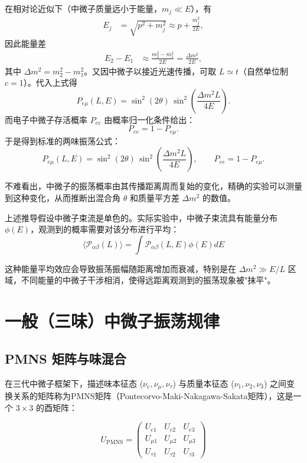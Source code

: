 在相对论近似下（中微子质量远小于能量，$m_j \ll E$），有
\begin{align*}
E_j &= \sqrt{p^2 + m_j^2} \approx p + \frac{m_j^2}{2E},
\end{align*}
因此能量差
\begin{align*}
E_2 - E_1 &\approx \frac{m_2^2 - m_1^2}{2E} = \frac{\Delta m^2}{2E},
\end{align*}
其中 $\Delta m^2 = m_2^2 - m_1^2$。又因中微子以接近光速传播，可取 $L \simeq t$（自然单位制 $c=1$）。代入上式得
\[
P_{e\mu}(L,E) = \sin^2(2\theta) \, \sin^2\!\left( \frac{\Delta m^2 L}{4E} \right).
\]
而电子中微子存活概率 $P_{ee}$ 由概率归一化条件给出：
\[
P_{ee} = 1 - P_{e\mu}.
\]
于是得到标准的两味振荡公式：
\begin{equation}\label{eq:2flavor}
\boxed{
P_{e\mu}(L,E) = \sin^2(2\theta) \, \sin^2\!\left( \frac{\Delta m^2 L}{4E} \right), \qquad
P_{ee} = 1 - P_{e\mu}.
}
\end{equation}

不难看出，中微子的振荡概率由其传播距离周而复始的变化，精确的实验可以测量到这种变化，从而推断出混合角 $\theta$ 和质量平方差 $\Delta m^2$ 的数值。
\begin{derivationnote}[实际束流的平均效应]
上述推导假设中微子束流是单色的。实际实验中，中微子束流具有能量分布 $\phi(E)$，观测到的概率需要对该分布进行平均：
\[
\langle \mathcal{P}_{\alpha\beta}(L) \rangle = \int \mathcal{P}_{\alpha\beta}(L, E) \phi(E) dE
\]

这种能量平均效应会导致振荡振幅随距离增加而衰减，特别是在 $\Delta m^2 \gg E/L$ 区域，不同能量的中微子干涉相消，使得远距离观测到的振荡现象被"抹平"。
\end{derivationnote}

\section{一般（三味）中微子振荡规律}

\subsection{PMNS 矩阵与味混合}

在三代中微子框架下，描述味本征态 ($\nu_e, \nu_\mu, \nu_\tau$) 与质量本征态 ($\nu_1, \nu_2, \nu_3$) 之间变换关系的矩阵称为PMNS矩阵（Pontecorvo-Maki-Nakagawa-Sakata矩阵），这是一个 $3\times 3$ 的酉矩阵：

\begin{equation}\label{eq:pmns_def}
U_{\mathrm{PMNS}} = \begin{pmatrix}
U_{e1} & U_{e2} & U_{e3} \\
U_{\mu 1} & U_{\mu 2} & U_{\mu 3} \\
U_{\tau 1} & U_{\tau 2} & U_{\tau 3}
\end{pmatrix}
\end{equation}

